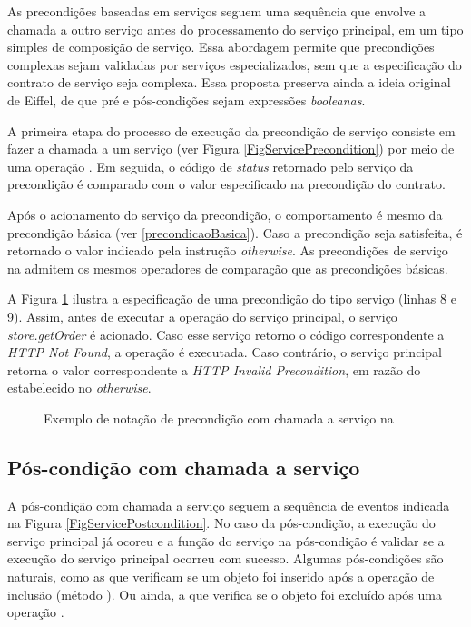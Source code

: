 As precondições baseadas em serviços seguem uma sequência que envolve a chamada
a outro serviço antes do processamento do serviço principal, em um tipo simples de
composição de serviço. Essa abordagem permite que precondições complexas sejam
validadas por serviços especializados, sem que a especificação do contrato
de serviço seja complexa. Essa proposta preserva ainda a ideia original de
Eiffel\cite{meyer1988eiffel}, de que pré e pós-condições sejam expressões
\emph{booleanas}.

A primeira etapa do processo de execução da precondição de serviço consiste em
fazer a chamada a um serviço (ver Figura \ref{FigServicePrecondition}) por meio de uma
operação . Em seguida, o código de \textit{status} retornado pelo
serviço da precondição é comparado com o valor especificado na precondição do contrato.

Após o acionamento do serviço da precondição, o comportamento é mesmo da
precondição básica (ver \ref{precondicaoBasica}). Caso a precondição seja
satisfeita, é retornado o valor indicado pela instrução \emph{otherwise}. As
precondições de serviço na \neoidl{} admitem os mesmos operadores de comparação
que as precondições básicas.

A Figura \ref{lst:DBCPreCondServico} ilustra a especificação de uma precondição
do tipo serviço (linhas 8 e 9). Assim, antes de executar a operação 
do serviço principal, o serviço \emph{store.getOrder} é acionado. Caso esse
serviço retorno o código correspondente a \emph{HTTP Not Found}, a operação
 é executada. Caso contrário, o serviço principal retorna o valor
correspondente a \emph{HTTP Invalid Precondition}, em razão do estabelecido no
\emph{otherwise}.


\begin{figure}[htb]
\begin{small}

\end{small}
\caption{Exemplo de notação de precondição com chamada a serviço na
\neoidl{}} 
\label{lst:DBCPreCondServico}
\end{figure} 



\subsection{Pós-condição com chamada a serviço}
\label{Pos-condicao servico}

A pós-condição com chamada a serviço seguem a sequência de eventos indicada na
Figura \ref{FigServicePostcondition}. No caso da pós-condição, a execução do
serviço principal já ocoreu e a função do serviço na pós-condição é validar se a
execução do serviço principal ocorreu com sucesso. Algumas pós-condições são
naturais, como as que verificam se um objeto foi inserido após a operação de
inclusão (método ). Ou ainda, a que verifica se o objeto foi excluído
após uma operação .

